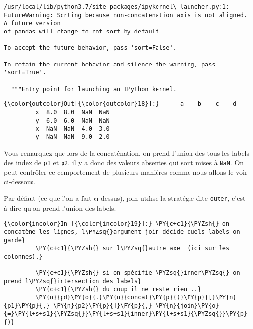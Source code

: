     \begin{Verbatim}[commandchars=\\\{\},frame=single,framerule=0.3mm,rulecolor=\color{cellframecolor}]
/usr/local/lib/python3.7/site-packages/ipykernel\_launcher.py:1: FutureWarning: Sorting because non-concatenation axis is not aligned. A future version
of pandas will change to not sort by default.

To accept the future behavior, pass 'sort=False'.

To retain the current behavior and silence the warning, pass 'sort=True'.

  """Entry point for launching an IPython kernel.
\end{Verbatim}

\begin{Verbatim}[commandchars=\\\{\},frame=single,framerule=0.3mm,rulecolor=\color{cellframecolor}]
{\color{outcolor}Out[{\color{outcolor}18}]:}      a    b    c    d
         x  8.0  8.0  NaN  NaN
         y  6.0  6.0  NaN  NaN
         x  NaN  NaN  4.0  3.0
         y  NaN  NaN  9.0  2.0
\end{Verbatim}
            
    Vous remarquez que lors de la concaténation, on prend l'union des tous
les labels des index de \texttt{p1} et \texttt{p2}, il y a donc des
valeurs absentes qui sont mises à \texttt{NaN}. On peut contrôler ce
comportement de plusieurs manières comme nous allons le voir ci-dessous.

    Par défaut (ce que l'on a fait ci-dessus), join utilise la stratégie
dite \texttt{outer}, c'est-à-dire qu'on prend l'union des labels.

    \begin{Verbatim}[commandchars=\\\{\},frame=single,framerule=0.3mm,rulecolor=\color{cellframecolor}]
{\color{incolor}In [{\color{incolor}19}]:} \PY{c+c1}{\PYZsh{} on concatène les lignes, l\PYZsq{}argument join décide quels labels on garde}
         \PY{c+c1}{\PYZsh{} sur l\PYZsq{}autre axe  (ici sur les colonnes).}
         
         \PY{c+c1}{\PYZsh{} si on spécifie \PYZsq{}inner\PYZsq{} on prend l\PYZsq{}intersection des labels}
         \PY{c+c1}{\PYZsh{} du coup il ne reste rien ..}
         \PY{n}{pd}\PY{o}{.}\PY{n}{concat}\PY{p}{(}\PY{p}{[}\PY{n}{p1}\PY{p}{,} \PY{n}{p2}\PY{p}{]}\PY{p}{,} \PY{n}{join}\PY{o}{=}\PY{l+s+s1}{\PYZsq{}}\PY{l+s+s1}{inner}\PY{l+s+s1}{\PYZsq{}}\PY{p}{)}
\end{Verbatim}


